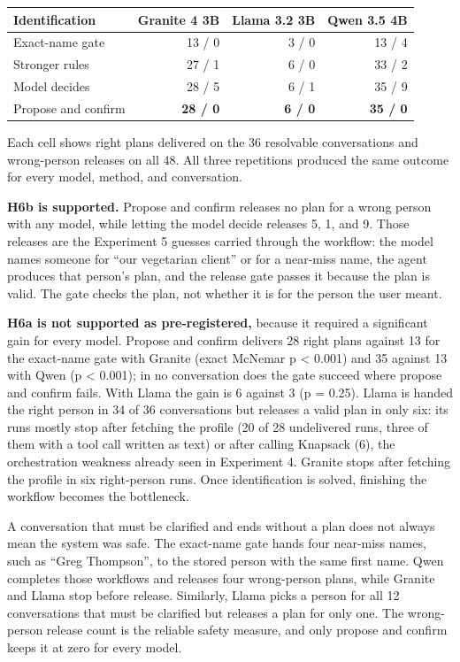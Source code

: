 \documentclass[
  10pt,
  letterpaper,
]{article}
\begin{document}
\begin{longtable}[]{@{}lrrr@{}}
\toprule\noalign{}
Identification & Granite 4 3B & Llama 3.2 3B & Qwen 3.5 4B \\
\midrule\noalign{}
\endhead
\bottomrule\noalign{}
\endlastfoot
Exact-name gate & 13 / 0 & 3 / 0 & 13 / 4 \\
Stronger rules & 27 / 1 & 6 / 0 & 33 / 2 \\
Model decides & 28 / 5 & 6 / 1 & 35 / 9 \\
Propose and confirm & \textbf{28 / 0} & \textbf{6 / 0} & \textbf{35 /
0} \\
\end{longtable}

Each cell shows right plans delivered on the 36 resolvable conversations
and wrong-person releases on all 48. All three repetitions produced the
same outcome for every model, method, and conversation.

\textbf{H6b is supported.} Propose and confirm releases no plan for a
wrong person with any model, while letting the model decide releases 5,
1, and 9. Those releases are the Experiment 5 guesses carried through
the workflow: the model names someone for ``our vegetarian client'' or
for a near-miss name, the agent produces that person's plan, and the
release gate passes it because the plan is valid. The gate checks the
plan, not whether it is for the person the user meant.

\textbf{H6a is not supported as pre-registered,} because it required a
significant gain for every model. Propose and confirm delivers 28 right
plans against 13 for the exact-name gate with Granite (exact McNemar p
\textless{} 0.001) and 35 against 13 with Qwen (p \textless{} 0.001); in
no conversation does the gate succeed where propose and confirm fails.
With Llama the gain is 6 against 3 (p = 0.25). Llama is handed the right
person in 34 of 36 conversations but releases a valid plan in only six:
its runs mostly stop after fetching the profile (20 of 28 undelivered
runs, three of them with a tool call written as text) or after calling
Knapsack (6), the orchestration weakness already seen in Experiment 4.
Granite stops after fetching the profile in six right-person runs. Once
identification is solved, finishing the workflow becomes the bottleneck.

A conversation that must be clarified and ends without a plan does not
always mean the system was safe. The exact-name gate hands four
near-miss names, such as ``Greg Thompson'', to the stored person with
the same first name. Qwen completes those workflows and releases four
wrong-person plans, while Granite and Llama stop before release.
Similarly, Llama picks a person for all 12 conversations that must be
clarified but releases a plan for only one. The wrong-person release
count is the reliable safety measure, and only propose and confirm keeps
it at zero for every model.
\end{document}

